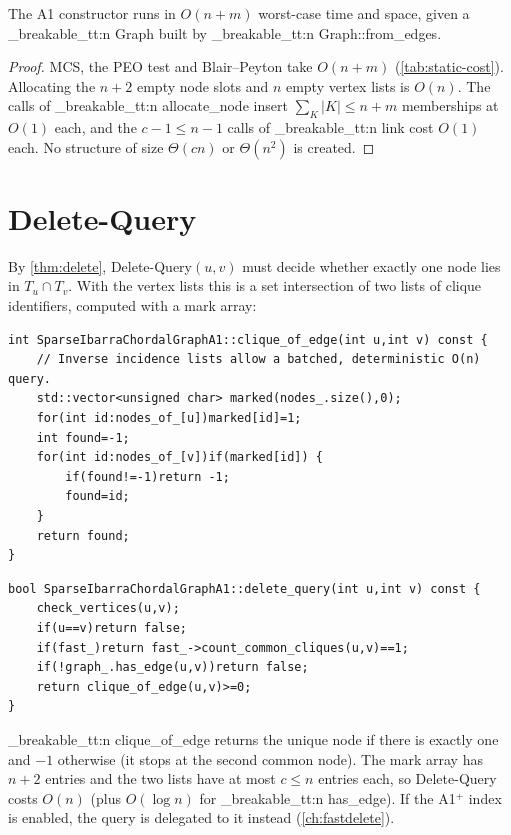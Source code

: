 \documentclass[11pt,a4paper,oneside]{report}
\theoremstyle{plain}
\theoremstyle{definition}
\theoremstyle{remark}
\newcommand{\op}[1]{\textsf{#1}}
\DeclareRobustCommand{\code}[1]{\mtp_breakable_tt:n {#1}}
\DeclareRobustCommand{\file}[1]{\mtp_breakable_tt:n {#1}}
\begin{document}
\begin{proposition}\label{prop:a1-pre}
The A1 constructor runs in \(O(n+m)\) worst-case time and space, given a \code{Graph}
built by \code{Graph::from_edges}.
\end{proposition}
\begin{proof}
MCS, the PEO test and Blair--Peyton take \(O(n+m)\) (\cref{tab:static-cost}). Allocating the
\(n+2\) empty node slots and \(n\) empty vertex lists is \(O(n)\). The calls of
\code{allocate_node} insert \(\sum_K|K|\le n+m\) memberships at \(O(1)\) each, and the
\(c-1\le n-1\) calls of \code{link} cost \(O(1)\) each. No structure of size \(\Theta(cn)\) or
\(\Theta(n^2)\) is created.
\end{proof}

\section{Delete-Query}\label{sec:a1-delete-query}
By \cref{thm:delete}, \op{Delete-Query}\((u,v)\) must decide whether exactly one node lies in
\(T_u\cap T_v\). With the vertex lists this is a set intersection of two lists of clique
identifiers, computed with a mark array:

\begin{lstlisting}[style=cpp,firstnumber=124,caption={\file{src/sparse_ibarra_a1.cpp}, lines 124--134: the unique clique containing an edge, or \(-1\).},label={lst:a1-clique-of-edge}]
int SparseIbarraChordalGraphA1::clique_of_edge(int u,int v) const {
    // Inverse incidence lists allow a batched, deterministic O(n) query.
    std::vector<unsigned char> marked(nodes_.size(),0);
    for(int id:nodes_of_[u])marked[id]=1;
    int found=-1;
    for(int id:nodes_of_[v])if(marked[id]) {
        if(found!=-1)return -1;
        found=id;
    }
    return found;
}
\end{lstlisting}

\begin{lstlisting}[style=cpp,firstnumber=185,caption={\file{src/sparse_ibarra_a1.cpp}, lines 185--191: \op{Delete-Query}.},label={lst:a1-delete-query}]
bool SparseIbarraChordalGraphA1::delete_query(int u,int v) const {
    check_vertices(u,v);
    if(u==v)return false;
    if(fast_)return fast_->count_common_cliques(u,v)==1;
    if(!graph_.has_edge(u,v))return false;
    return clique_of_edge(u,v)>=0;
}
\end{lstlisting}

\noindent\code{clique_of_edge} returns the unique node if there is exactly one and \(-1\)
otherwise (it stops at the second common node). The mark array has \(n+2\) entries and the two
lists have at most \(c\le n\) entries each, so \op{Delete-Query} costs \(O(n)\) (plus
\(O(\log n)\) for \code{has_edge}). If the A1\(^+\) index is enabled, the query is delegated to
it instead (\cref{ch:fastdelete}).
\end{document}
